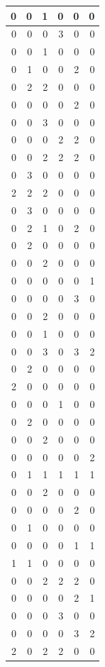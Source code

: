 \documentclass[
  12pt,
]{krantz}
\begin{document}
\begin{tabular}{r|r|r|r|r|r}
\hline
0 & 0 & 1 & 0 & 0 & 0\\
\hline
0 & 0 & 0 & 3 & 0 & 0\\
\hline
0 & 0 & 1 & 0 & 0 & 0\\
\hline
0 & 1 & 0 & 0 & 2 & 0\\
\hline
0 & 2 & 2 & 0 & 0 & 0\\
\hline
0 & 0 & 0 & 0 & 2 & 0\\
\hline
0 & 0 & 3 & 0 & 0 & 0\\
\hline
0 & 0 & 0 & 2 & 2 & 0\\
\hline
0 & 0 & 2 & 2 & 2 & 0\\
\hline
0 & 3 & 0 & 0 & 0 & 0\\
\hline
2 & 2 & 2 & 0 & 0 & 0\\
\hline
0 & 3 & 0 & 0 & 0 & 0\\
\hline
0 & 2 & 1 & 0 & 2 & 0\\
\hline
0 & 2 & 0 & 0 & 0 & 0\\
\hline
0 & 0 & 2 & 0 & 0 & 0\\
\hline
0 & 0 & 0 & 0 & 0 & 1\\
\hline
0 & 0 & 0 & 0 & 3 & 0\\
\hline
0 & 0 & 2 & 0 & 0 & 0\\
\hline
0 & 0 & 1 & 0 & 0 & 0\\
\hline
0 & 0 & 3 & 0 & 3 & 2\\
\hline
0 & 2 & 0 & 0 & 0 & 0\\
\hline
2 & 0 & 0 & 0 & 0 & 0\\
\hline
0 & 0 & 0 & 1 & 0 & 0\\
\hline
0 & 2 & 0 & 0 & 0 & 0\\
\hline
0 & 0 & 2 & 0 & 0 & 0\\
\hline
0 & 0 & 0 & 0 & 0 & 2\\
\hline
0 & 1 & 1 & 1 & 1 & 1\\
\hline
0 & 0 & 2 & 0 & 0 & 0\\
\hline
0 & 0 & 0 & 0 & 2 & 0\\
\hline
0 & 1 & 0 & 0 & 0 & 0\\
\hline
0 & 0 & 0 & 0 & 1 & 1\\
\hline
1 & 1 & 0 & 0 & 0 & 0\\
\hline
0 & 0 & 2 & 2 & 2 & 0\\
\hline
0 & 0 & 0 & 0 & 2 & 1\\
\hline
0 & 0 & 0 & 3 & 0 & 0\\
\hline
0 & 0 & 0 & 0 & 3 & 2\\
\hline
2 & 0 & 2 & 2 & 0 & 0\\

\end{tabular}
\end{document}
